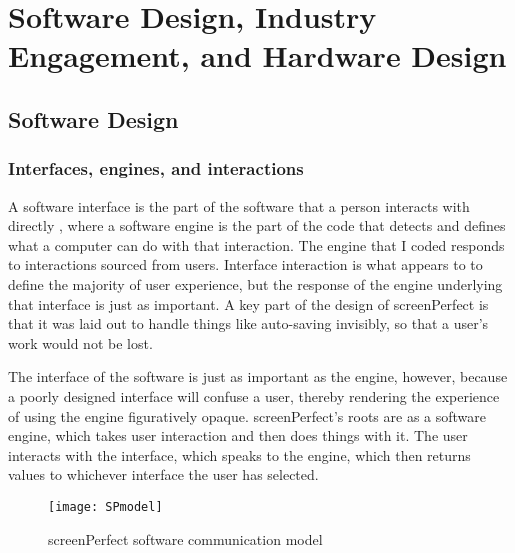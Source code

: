 
\chapter{Software Design, Industry Engagement, and Hardware Design} %
\label{Chapter3} %




\section{Software Design}
\subsection{Interfaces, engines, and interactions}

A software interface is the part of the software that a person interacts with directly \cite{interactiondestext}, where a software engine is the part of the code that detects and defines what a computer can do with that interaction. The engine that I coded responds to interactions sourced from users. Interface interaction is what appears to to define the majority of user experience, but the response of the engine underlying that interface is just as important. A key part of the design of screenPerfect is that it was laid out to handle things like auto-saving invisibly, so that a user's work would not be lost.

The interface of the software is just as important as the engine, however, because a poorly designed interface will confuse a user, thereby rendering the experience of using the engine figuratively opaque. screenPerfect's roots are as a software engine, which takes user interaction and then does things with it. The user interacts with the interface, which speaks to the engine, which then returns values to whichever interface the user has selected.

\begin{figure}[h]
  \caption{screenPerfect software communication model}
  \centering
    \texttt{[image: SPmodel]}
\end{figure}


